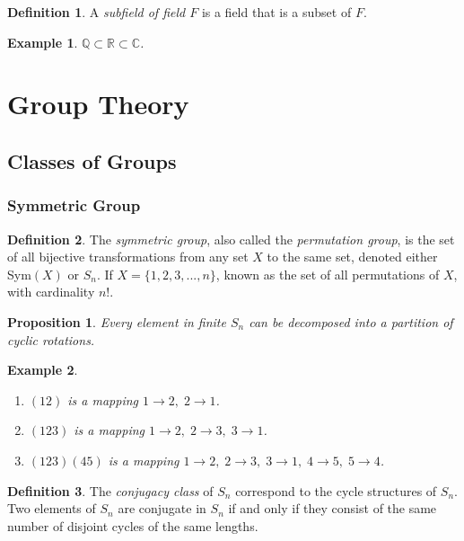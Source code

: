 \documentclass{article}
\newtheorem{proposition}[theorem]{Proposition}
\newtheorem{example}{Example}[section]
\theoremstyle{remark}
\theoremstyle{definition}
\newtheorem{definition}{Definition}[section]
\begin{document}
\begin{definition}
A \textit{subfield of field $F$} is a field that is a subset of $F$.
\end{definition}

\begin{example}
$\mathbb{Q} \subset \mathbb{R} \subset \mathbb{C}$. 
\end{example}

\section{Group Theory}
\subsection{Classes of Groups}
\subsubsection{Symmetric Group}
\begin{definition}
The \textit{symmetric group}, also called the \textit{permutation group}, is the set of all bijective transformations from any set $X$ to the same set, denoted either Sym$(X)$ or $S_n$. If $X = \{1, 2, 3 ,... , n\}$, known as the set of all permutations of $X$, with cardinality $n!$. 
\end{definition}

\begin{proposition}
Every element in finite $S_{n}$ can be decomposed into a partition of cyclic rotations.
\end{proposition}

\begin{example}
\begin{enumerate}
    \item $(1 2)$ is a mapping $1 \rightarrow 2,\; 2 \rightarrow 1$. 
    \item $(1 2 3)$ is a mapping $1\rightarrow 2,\; 2 \rightarrow 3,\; 3 \rightarrow 1$. 
    \item $(1 2 3) (4 5)$ is a mapping $1\rightarrow 2,\; 2 \rightarrow 3,\; 3 \rightarrow 1, \;4 \rightarrow 5, \;5 \rightarrow 4$. 
\end{enumerate}
\end{example}

\begin{definition}
The \textit{conjugacy class} of $S_{n}$ correspond to the cycle structures of $S_{n}$. Two elements of $S_{n}$ are conjugate in $S_{n}$ if and only if they consist of the same number of disjoint cycles of the same lengths. 
\end{definition}
\end{document}
